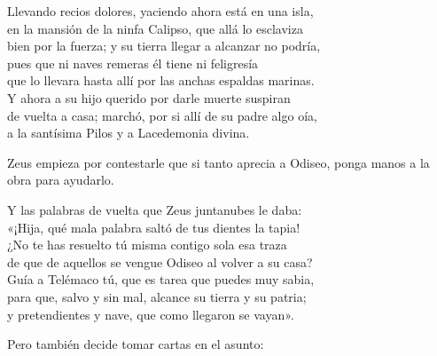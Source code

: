 \begin{versocita}
Llevando recios dolores, yaciendo ahora está en una isla,\\
en la mansión de la ninfa Calipso, que allá lo esclaviza\\
bien por la fuerza; y su tierra llegar a alcanzar no podría,\\
pues que ni naves remeras él tiene ni feligresía\\
que lo llevara hasta allí por las anchas espaldas marinas.\\
Y ahora a su hijo querido por darle muerte suspiran\\
de vuelta a casa; marchó, por si allí de su padre algo oía,\\
a la santísima Pilos y a Lacedemonia divina.
\end{versocita}


Zeus empieza por contestarle que si tanto aprecia a Odiseo, ponga manos a la obra para ayudarlo.

\begin{versocita}
Y las palabras de vuelta que Zeus juntanubes le daba:\\
«¡Hija, qué mala palabra saltó de tus dientes la tapia!\\
¿No te has resuelto tú misma contigo sola esa traza\\
de que de aquellos se vengue Odiseo al volver a su casa?\\
Guía a Telémaco tú, que es tarea que puedes muy sabia,\\
para que, salvo y sin mal, alcance su tierra y su patria;\\
y pretendientes y nave, que como llegaron se vayan».
\end{versocita}

Pero también decide tomar cartas en el asunto:

